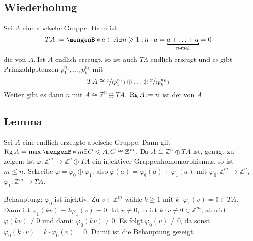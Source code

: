 \subsection[Wiederholung: Torsionsgruppe]{Wiederholung} %
\label{sub:41}
Sei $A$ eine abelsche Gruppe. Dann ist 
\[
	T A := \set[a \in A]{\exists n \ge 1 : n \cdot a = \underbracket[1pt][2pt]{a + \ldots + a}_{\text{$n$-mal}} = 0} 
\]
die  von $A$. Ist $A$ endlich erzeugt, so ist auch $TA$ endlich erzeugt und es gibt Primzahlpotenzen $p_1^{n_1}, \ldots , p_k^{n_k}$ mit
\[
	TA \cong \nicefrac{\mathds{Z}}{(p_1^{n_1})} \oplus \ldots \oplus \nicefrac{\mathds{Z}}{(p_k^{n_k})}
\]
Weiter gibt es dann $n$ mit $A \cong \mathds{Z}^n \oplus TA$. $\Rg A := n$ ist der  von $A$.

\subsection[Lemma: Rang einer endlich erzeugten abelschen Gruppe]{Lemma} %
\label{sub:42}
Sei $A$ eine endlich erzeugte abelsche Gruppe. Dann gilt $\Rg A = \max \set[m]{\exists C \le A, C \cong \mathds{Z}^m}$.
Da $A \cong \mathds{Z}^n \oplus T A$ ist, genügt zu zeigen: Ist $\varphi \colon \mathds{Z}^m \to \mathds{Z}^n \oplus T A$ ein injektiver Gruppenhomomorphismus, so ist 
$m \le n$. Schreibe $\varphi = \varphi_0 \oplus \varphi_1$, also $\varphi(a) = \varphi_0(a) + \varphi_1(a)$ mit $\varphi_0 \colon \mathds{Z}^m \to \mathds{Z}^n$, 
$\varphi_1 \colon \mathds{Z}^m \to T A$. 

Behauptung: $\varphi_0$ ist injektiv. Zu $v \in \mathds{Z}^m$ wähle $k\ge 1$ mit $k \cdot \varphi_1(v) = 0 \in T A$. Dann ist $\varphi_1(k v) = k \varphi_1(v)=0$.
Ist $v \not= 0$, so ist $k \cdot v \not= 0 \in \mathds{Z}^m$, also ist $\varphi(k v) \not= 0$ und damit $\varphi_0(k v) \not= 0$. Es folgt $\varphi_0(v) \not= 0$, da sonst
$\varphi_0(k \cdot v) = k \cdot \varphi_0(v)= 0$. Damit ist die Behauptung gezeigt.

